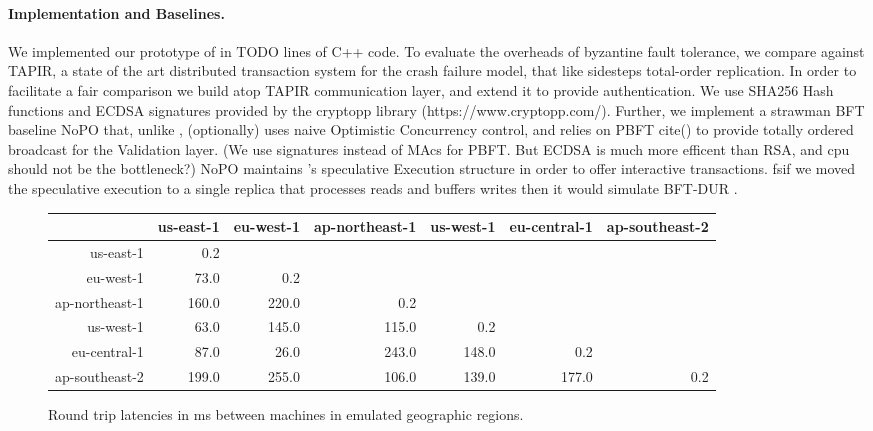 \paragraph{Implementation and Baselines.} We implemented our prototype of \sys in TODO lines of C++ code. To evaluate the overheads of byzantine fault tolerance, we compare against TAPIR\cite{zhang2015tapir}, a state of the art distributed transaction system for the crash failure model, that like \sys sidesteps total-order replication. In order to facilitate a fair comparison we build \sys atop TAPIR communication layer, and extend it to provide authentication. We use SHA256 Hash functions and ECDSA signatures provided by the cryptopp library (https://www.cryptopp.com/). Further, we implement a strawman BFT baseline NoPO that, unlike \sys, (optionally) uses naive Optimistic Concurrency control, and relies on PBFT cite() to provide totally ordered broadcast for the Validation layer. (We use signatures instead of MAcs for PBFT. But ECDSA is much more efficent than RSA, and cpu should not be the bottleneck?) NoPO maintains \sys 's speculative Execution structure in order to offer interactive transactions. fs{if we moved the speculative execution to a single replica that processes reads and buffers writes then it would simulate BFT-DUR }. 

\begin{figure}[t]
\centering
\begin{tabular}{r  r  r  r  r  r  r}
  \multicolumn{1}{r|}{} & us-east-1 &  eu-west-1 &  ap-northeast-1 &  us-west-1 &  eu-central-1 & ap-southeast-2 \\
  \hline
  \multicolumn{1}{r|}{us-east-1}      &   0.2 \\
  \multicolumn{1}{r|}{eu-west-1}      &  73.0 &   0.2 \\
  \multicolumn{1}{r|}{ap-northeast-1} & 160.0 & 220.0 &   0.2 \\
  \multicolumn{1}{r|}{us-west-1}      &  63.0 & 145.0 & 115.0 &   0.2 \\
  \multicolumn{1}{r|}{eu-central-1}   &  87.0 &  26.0 & 243.0 & 148.0 & 0.2 \\
  \multicolumn{1}{r|}{ap-southeast-2} & 199.0 & 255.0 & 106.0 & 139.0 & 177.0 & 0.2 \\
\end{tabular}
\caption{Round trip latencies in ms between machines in emulated geographic
  regions.}
\label{tab:latencies}
\end{figure}

